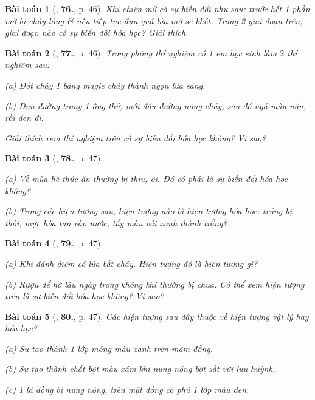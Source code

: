 \documentclass{article}
\numberwithin{equation}{section}
\newtheorem{baitoan}{Bài toán}
\begin{document}
\begin{baitoan}[\cite{An_400_BT_Hoa_Hoc_8_2020}, \textbf{76.}, p. 46]
	Khi chiên mỡ có sự biến đổi như sau: trước hết 1 phần mỡ bị chảy lỏng \& nếu tiếp tục đun quá lửa mỡ sẽ khét. Trong 2 giai đoạn trên, giai đoạn nào có sự biến đổi hóa học? Giải thích.
\end{baitoan}

\begin{baitoan}[\cite{An_400_BT_Hoa_Hoc_8_2020}, \textbf{77.}, p. 46]
	Trong phòng thí nghiệm có 1 em học sinh làm $2$ thí nghiệm sau:
	\begin{enumerate*}
		\item[(a)] Đốt cháy 1 băng magie cháy thành ngọn lửa sáng.
		\item[(b)] Đun đường trong 1 ống thử, mới đầu đường nóng chảy, sau đó ngả màu nâu, rồi đen đi.
	\end{enumerate*}
	Giải thích xem thí nghiệm trên có sự biến đổi hóa học không? Vì sao?
\end{baitoan}

\begin{baitoan}[\cite{An_400_BT_Hoa_Hoc_8_2020}, \textbf{78.}, p. 47]
	\begin{enumerate*}
		\item[(a)] Về mùa hè thức ăn thường bị thiu, ôi. Đó có phải là sự biến đổi hóa học không?
		\item[(b)] Trong các hiện tượng sau, hiện tượng nào là hiện tượng hóa học: trứng bị thối, mực hòa tan vào nước, tẩy màu vải xanh thành trắng?
	\end{enumerate*}
\end{baitoan}

\begin{baitoan}[\cite{An_400_BT_Hoa_Hoc_8_2020}, \textbf{79.}, p. 47]
\begin{enumerate*}
	\item[(a)] Khi đánh diêm có lửa bắt cháy. Hiện tượng đó là hiện tượng gì?
	\item[(b)] Rượu để hở lâu ngày trong không khí thường bị chua. Có thể xem hiện tượng trên là sự biến đổi hóa học không? Vì sao?
	\end{enumerate*}
\end{baitoan}

\begin{baitoan}[\cite{An_400_BT_Hoa_Hoc_8_2020}, \textbf{80.}, p. 47]
	Các hiện tượng sau đây thuộc về hiện tượng vật lý hay hóa học?
	\begin{enumerate*}
		\item[(a)] Sự tạo thành 1 lớp mỏng màu xanh trên mâm đồng.
		\item[(b)] Sự tạo thành chất bột màu xám khi nung nóng bột sắt với lưu huỳnh.
		\item[(c)] 1 lá đồng bị nung nóng, trên mặt đồng có phủ 1 lớp màu đen.
	\end{enumerate*}
\end{baitoan}
\end{document}
